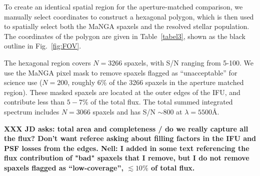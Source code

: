 \documentclass[preprint2]{aastex62}
\newcommand{\ang}{\ensuremath{\mbox{\AA}}\xspace}
\begin{document}
To create an identical spatial region for the aperture-matched comparison, we manually select coordinates to construct a hexagonal polygon, which is then used to spatially select both the MaNGA spaxels and the resolved stellar population. The coordinates of the polygon are given in Table~\ref{tabel3}, shown as the black outline in Fig.~\ref{fig:FOV}.

The hexagonal region covers $N=3266$ spaxels, with S/N ranging from 5-100. We use the MaNGA pixel mask to remove spaxels flagged as ``unacceptable'' for science use ($N=200$, roughly 6\% of the 3266 spaxels in the aperture matched region). These masked spaxels are located at the outer edges of the IFU, and contribute less than $5-7$\% of the total flux. The total summed integrated spectrum includes $N=3066$ spaxels and has S/N $\sim800$ at $\lambda=5500\ang$. 

\textbf{XXX JD asks: total area and completeness / do we really capture all the flux? Don't want referee asking about filling factors in the IFU and PSF losses from the edges. Nell: I added in some text referencing the flux contribution of "bad" spaxels that I remove, but I do not remove spaxels flagged as ``low-coverage'', $\lesssim 10\%$ of total flux.}
\end{document}
